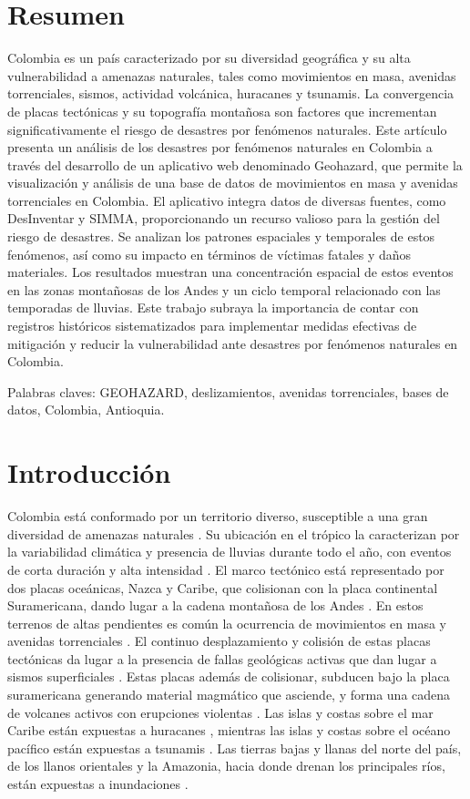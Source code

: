 \documentclass{article}
\begin{document}
\section*{Resumen}
Colombia es un país caracterizado por su diversidad geográfica y su alta vulnerabilidad a amenazas naturales, tales como movimientos en masa, avenidas torrenciales, sismos, actividad volcánica, huracanes y tsunamis. La convergencia de placas tectónicas y su topografía montañosa son factores que incrementan significativamente el riesgo de desastres por fenómenos naturales. Este artículo presenta un análisis de los desastres por fenómenos naturales en Colombia a través del desarrollo de un aplicativo web denominado Geohazard, que permite la visualización y análisis de una base de datos de movimientos en masa y avenidas torrenciales en Colombia. El aplicativo integra datos de diversas fuentes, como DesInventar y SIMMA, proporcionando un recurso valioso para la gestión del riesgo de desastres. Se analizan los patrones espaciales y temporales de estos fenómenos, así como su impacto en términos de víctimas fatales y daños materiales. Los resultados muestran una concentración espacial de estos eventos en las zonas montañosas de los Andes y un ciclo temporal relacionado con las temporadas de lluvias. Este trabajo subraya la importancia de contar con registros históricos sistematizados para implementar medidas efectivas de mitigación y reducir la vulnerabilidad ante desastres por fenómenos naturales en Colombia.
\par Palabras claves: GEOHAZARD, deslizamientos, avenidas torrenciales, bases de datos, Colombia, Antioquia.


\section{Introducción}
Colombia está conformado por un territorio diverso, susceptible a una gran diversidad de amenazas naturales \cite{aristizabal2006geomorfologia}. Su ubicación en el trópico la caracterizan por la variabilidad climática y presencia de lluvias durante todo el año, con eventos de corta duración y alta intensidad \cite{poveda2004hidroclimatologia}. El marco tectónico está representado por dos placas oceánicas, Nazca y Caribe, que colisionan con la placa continental Suramericana, dando lugar a la cadena montañosa de los Andes \cite{cediel2003tectonic}. En estos terrenos de altas pendientes es común la ocurrencia de movimientos en masa y avenidas torrenciales \cite{aristizabal2020spatial}.  El continuo desplazamiento y colisión de estas placas tectónicas da lugar a la presencia de fallas geológicas activas que dan lugar a sismos superficiales \cite{taboada2000geodynamics}. Estas placas además de colisionar, subducen bajo la placa suramericana generando material magmático que asciende, y forma una cadena de volcanes activos con erupciones violentas \cite{vasquez2010magmatic}. Las islas y costas sobre el mar Caribe están expuestas a huracanes \cite{ortiz2012exposure}, mientras las islas y costas sobre el océano pacífico están expuestas a tsunamis \cite{otero2014tsunami}. Las tierras bajas y llanas del norte del país, de los llanos orientales y la Amazonia, hacia donde drenan los principales ríos, están expuestas a inundaciones \cite{duarte2017identificacion}.
\end{document}
